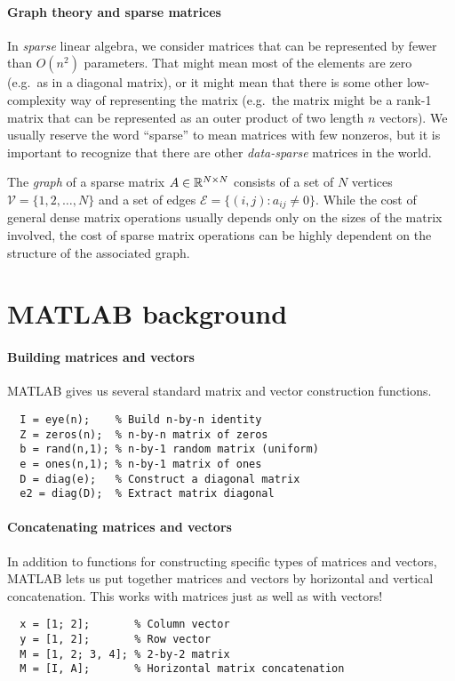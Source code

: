\documentclass[12pt, leqno]{article}
\begin{document}
\paragraph{Graph theory and sparse matrices}
In {\em sparse} linear algebra, we consider matrices that can be
represented by fewer than $O(n^2)$ parameters.  That might mean most
of the elements are zero (e.g.~as in a diagonal matrix), or it might
mean that there is some other low-complexity way of representing the
matrix (e.g.~the matrix might be a rank-1 matrix that can be
represented as an outer product of two length $n$ vectors).  We
usually reserve the word ``sparse'' to mean matrices with few
nonzeros, but it is important to recognize that there are other
{\em data-sparse} matrices in the world.

The {\em graph} of a sparse matrix $A \in \mathbb{R}^{N \times N}$ consists
of a set of $N$ vertices $\mathcal{V} = \{1, 2, \ldots, N\}$ and a set
of edges $\mathcal{E} = \{(i,j) : a_{ij} \neq 0\}$.  While the cost of
general dense matrix operations usually depends only on the sizes of
the matrix involved, the cost of sparse matrix operations can be
highly dependent on the structure of the associated graph.

\section{MATLAB background}

\paragraph{Building matrices and vectors}
MATLAB gives us several standard matrix and vector construction functions.
\begin{lstlisting}
  I = eye(n);    % Build n-by-n identity
  Z = zeros(n);  % n-by-n matrix of zeros
  b = rand(n,1); % n-by-1 random matrix (uniform)
  e = ones(n,1); % n-by-1 matrix of ones
  D = diag(e);   % Construct a diagonal matrix
  e2 = diag(D);  % Extract matrix diagonal
\end{lstlisting}

\paragraph{Concatenating matrices and vectors}
In addition to functions for constructing specific types of matrices
and vectors, MATLAB lets us put together matrices and vectors by
horizontal and vertical concatenation.  This works with
matrices just as well as with vectors!
\begin{lstlisting}
  x = [1; 2];       % Column vector
  y = [1, 2];       % Row vector
  M = [1, 2; 3, 4]; % 2-by-2 matrix
  M = [I, A];       % Horizontal matrix concatenation
\end{lstlisting}
\end{document}
